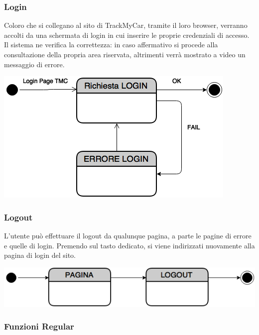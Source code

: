 \documentclass[a4paper,12pt]{beamer}
\begin{document}
\begin{frame}
\frametitle{Login}
Coloro che si collegano al sito di TrackMyCar, tramite il loro browser, verranno accolti da una schermata di login in cui inserire le proprie credenziali di accesso. Il sistema ne verifica la correttezza: in caso affermativo si procede alla consultazione della propria area riservata, altrimenti verrà mostrato a video un messaggio di errore.
\begin{center}
\includegraphics[scale=0.5]{../UseCase/Login.png}
\end{center}
\end{frame}

\begin{frame}
\frametitle{Logout}
L'utente può effettuare il logout da qualunque pagina, a parte le pagine di errore e quelle di login. Premendo sul tasto dedicato, si viene indirizzati nuovamente alla pagina di login del sito.
\begin{center}
\includegraphics[scale=0.5]{../UseCase/Logout.png}
\end{center}
\end{frame}

\begin{frame}
\frametitle{Funzioni Regular}
\begin{center}
\end{center}
\end{frame}
\end{document}
